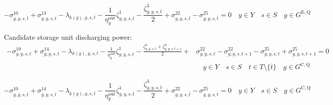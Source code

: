 \documentclass{article}
\newcommand{\sStorageExisting}{G^{\mathrm{E,Q}}}
\newcommand{\sStorageCandidate}{G^{\mathrm{C,Q}}}
\newcommand{\sYears}{Y}
\newcommand{\sScenarios}{S}
\newcommand{\sIntervals}{T}
\newcommand{\iGenerator}{g}
\newcommand{\iYear}{y}
\newcommand{\iScenario}{s}
\newcommand{\iInterval}{t}
\newcommand{\iIntervalTerminal}{\overline{\iInterval}}
\newcommand{\iZone}{z}
\newcommand{\cStorageUnitEfficiencyDischarging}{\eta_{\iGenerator}^{\mathrm{out}}}
\newcommand{\dNonNegativeDischarging}[1][\iGenerator,\iYear,\iScenario,\iInterval]{\sigma_{#1}^{10}}
\newcommand{\dMaxDischargingRateExisting}[1][\iGenerator,\iYear,\iScenario,\iInterval]{\sigma_{#1}^{13}}
\newcommand{\dMaxDischargingRateCandidate}[1][\iGenerator,\iYear,\iScenario,\iInterval]{\sigma_{#1}^{14}}
\newcommand{\dRampRateUpStorageDischarging}[1][\iGenerator,\iYear,\iScenario,\iInterval]{\sigma_{#1}^{22}}
\newcommand{\dRampRateDownStorageDischarging}[1][\iGenerator,\iYear,\iScenario,\iInterval]{\sigma_{#1}^{25}}
\newcommand{\dPowerBalance}[1][\iZone,\iYear,\iScenario,\iInterval]{\lambda_{#1}}
\newcommand{\dStorageEnergyTransition}[1][\iGenerator,\iYear,\iScenario,\iInterval]{\zeta_{#1}^{1}}
\newcommand{\dStorageEnergyOutput}[1][\iGenerator,\iYear,\iScenario,\iInterval]{\zeta_{#1}^{3}}
\begin{document}
\begin{equation}
- \dNonNegativeDischarging[\iGenerator,\iYear,\iScenario,\iIntervalTerminal] + \dMaxDischargingRateExisting[\iGenerator,\iYear,\iScenario,\iIntervalTerminal] - \dPowerBalance[k(\iGenerator),\iYear,\iScenario,\iIntervalTerminal] - \frac{1}{\cStorageUnitEfficiencyDischarging} \dStorageEnergyTransition[\iGenerator,\iYear,\iScenario,\iIntervalTerminal] - \frac{\dStorageEnergyOutput[\iGenerator,\iYear,\iScenario,\iIntervalTerminal]}{2} + \dRampRateUpStorageDischarging[\iGenerator,\iYear,\iScenario,\iIntervalTerminal] - \dRampRateDownStorageDischarging[\iGenerator,\iYear,\iScenario,\iIntervalTerminal] = 0 \quad \iYear \in \sYears \quad \iScenario \in \sScenarios \quad \iGenerator \in \sStorageExisting
\end{equation}

Candidate storage unit discharging power:
\begin{align}
- \dNonNegativeDischarging + \dMaxDischargingRateCandidate - \dPowerBalance[k(\iGenerator),\iYear,\iScenario,\iInterval] - \frac{1}{\cStorageUnitEfficiencyDischarging} \dStorageEnergyTransition - \frac{\dStorageEnergyOutput + \dStorageEnergyOutput[\iGenerator,\iYear,\iScenario,\iInterval+1]}{2} + & \dRampRateUpStorageDischarging - \dRampRateUpStorageDischarging[\iGenerator,\iYear,\iScenario,\iInterval+1]
- \dRampRateDownStorageDischarging + \dRampRateDownStorageDischarging[\iGenerator,\iYear,\iScenario,\iInterval + 1] = 0 \nonumber\\
& \quad \iYear \in \sYears \quad \iScenario \in \sScenarios \quad \iInterval \in \sIntervals \setminus \{\iIntervalTerminal\} \quad \iGenerator \in \sStorageCandidate
\end{align}

\begin{equation}
- \dNonNegativeDischarging[\iGenerator,\iYear,\iScenario,\iIntervalTerminal] + \dMaxDischargingRateCandidate[\iGenerator,\iYear,\iScenario,\iIntervalTerminal] - \dPowerBalance[k(\iGenerator),\iYear,\iScenario,\iIntervalTerminal] - \frac{1}{\cStorageUnitEfficiencyDischarging} \dStorageEnergyTransition[\iGenerator,\iYear,\iScenario,\iIntervalTerminal] - \frac{\dStorageEnergyOutput[\iGenerator,\iYear,\iScenario,\iIntervalTerminal]}{2} + \dRampRateUpStorageDischarging[\iGenerator,\iYear,\iScenario,\iIntervalTerminal] - \dRampRateDownStorageDischarging[\iGenerator,\iYear,\iScenario,\iIntervalTerminal] = 0 \quad \iYear \in \sYears \quad \iScenario \in \sScenarios \quad \iGenerator \in \sStorageCandidate
\end{equation}
\end{document}

